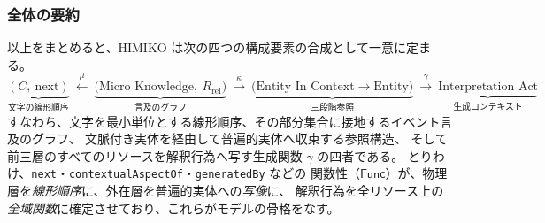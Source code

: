 \subsubsection*{全体の要約}

以上をまとめると、HIMIKO は次の四つの構成要素の合成として一意に定まる。
\[
  \underbrace{(C,\ \mathrm{next})}_{\text{文字の線形順序}}
  \ \xleftarrow{\ \mu\ }\
  \underbrace{\bigl(\text{Micro Knowledge},\ R_{\mathrm{rel}}\bigr)}_{\text{言及のグラフ}}
  \ \xrightarrow{\ \kappa\ }\
  \underbrace{\bigl(\text{Entity In Context} \to \text{Entity}\bigr)}_{\text{三段階参照}}
  \ \xrightarrow{\ \gamma\ }\
  \underbrace{\text{Interpretation Act}}_{\text{生成コンテキスト}}
\]
すなわち、文字を最小単位とする線形順序、その部分集合に接地するイベント言及のグラフ、
文脈付き実体を経由して普遍的実体へ収束する参照構造、
そして前三層のすべてのリソースを解釈行為へ写す生成関数 $\gamma$ の四者である。
とりわけ、\texttt{next}・\texttt{contextualAspectOf}・\texttt{generatedBy} などの
関数性（$\mathsf{Func}$）が、物理層を\emph{線形順序}に、外在層を普遍的実体への\emph{写像}に、
解釈行為を全リソース上の\emph{全域関数}に確定させており、これらがモデルの骨格をなす。
